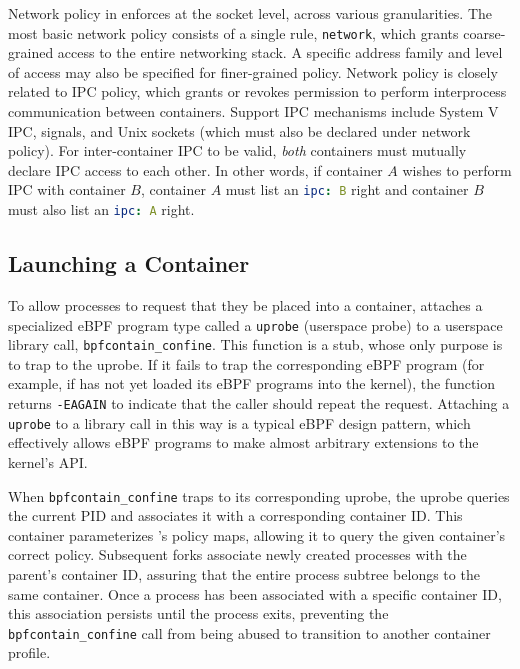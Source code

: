 Network policy in \bpfcontain{} enforces at the socket level, across various granularities. The most basic network policy consists of a single rule, \texttt{network}, which grants coarse-grained access to the entire networking stack. A specific address family and level of access may also be specified for finer-grained policy. Network policy is closely related to IPC policy, which grants or revokes permission to perform interprocess communication between containers. Support IPC mechanisms include System V IPC, signals, and Unix sockets (which must also be declared under network policy). For inter-container IPC to be valid, \textit{both} containers must mutually declare IPC access to each other. In other words, if container $A$ wishes to perform IPC with container $B$, container $A$ must list an \lstinline[language=yaml]{ipc: B} right and container $B$ must also list an \lstinline[language=yaml]{ipc: A} right.


\subsection{Launching a \bpfcontain{} Container}
\label{sub:launching}

To allow processes to request that they be placed into a container, \bpfcontain{} attaches a specialized eBPF program type called a \texttt{uprobe} (userspace probe) to a userspace library call, \texttt{bpfcontain\_confine}.  This function is a stub, whose only purpose is to trap to the uprobe. If it fails to trap the corresponding eBPF program (for example, if \bpfcontain{} has not yet loaded its eBPF programs into the kernel), the function returns \texttt{-EAGAIN} to indicate that the caller should repeat the request. Attaching a \texttt{uprobe} to a library call in this way is a typical eBPF design pattern, which effectively allows eBPF programs to make almost arbitrary extensions to the kernel's API.

When \texttt{bpfcontain\_confine} traps to its corresponding uprobe, the uprobe queries the current PID and associates it with a corresponding container ID. This container parameterizes \bpfcontain{}'s policy maps, allowing it to query the given container's correct policy. Subsequent forks associate newly created processes with the parent's container ID, assuring that the entire process subtree belongs to the same container. Once a process has been associated with a specific container ID, this association persists until the process exits, preventing the \texttt{bpfcontain\_confine} call from being abused to transition to another container profile.

